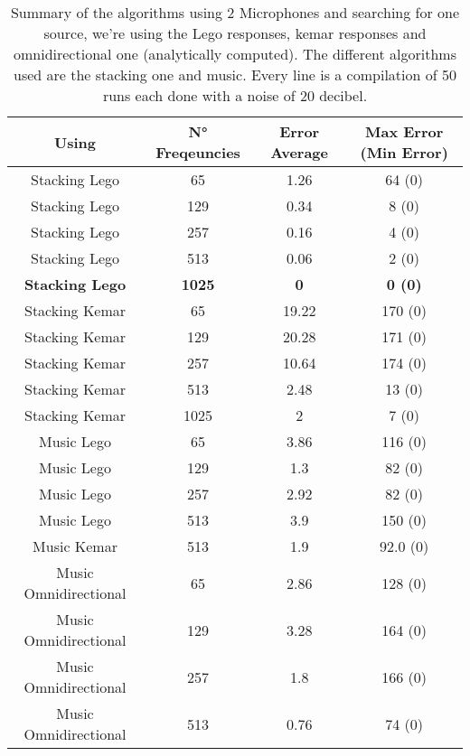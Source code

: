\begin{table}[H]
   \centering
    \begin{tabular}{|c|c|c|c|}
      \hline
      Using & N° Freqeuncies & Error Average & Max Error (Min Error) \\
      \hline
      Stacking Lego & 65 & 1.26 & 64 (0) \\
      Stacking Lego & 129 & 0.34 & 8 (0) \\
      Stacking Lego & 257 & 0.16 & 4 (0) \\
      Stacking Lego & 513 & 0.06 & 2 (0) \\
      \textbf{Stacking Lego} & \textbf{1025} & \textbf{0} & \textbf{0 (0)} \\

      Stacking Kemar & 65 & 19.22 & 170 (0) \\
      Stacking Kemar & 129 & 20.28 & 171 (0) \\
      Stacking Kemar & 257 & 10.64 & 174 (0) \\
      Stacking Kemar & 513 & 2.48 & 13 (0) \\
      Stacking Kemar & 1025 & 2 & 7 (0) \\
      
      Music Lego & 65 & 3.86 & 116 (0) \\
      Music Lego & 129 & 1.3 & 82 (0) \\
      Music Lego & 257 & 2.92 & 82 (0) \\
      Music Lego & 513 & 3.9 & 150 (0) \\
      
      
      
      Music Kemar & 513 & 1.9 & 92.0 (0) \\
      
      Music Omnidirectional & 65 & 2.86 & 128 (0) \\
      Music Omnidirectional & 129 & 3.28 & 164 (0) \\
      Music Omnidirectional & 257 & 1.8 & 166 (0) \\
      Music Omnidirectional & 513 & 0.76 & 74 (0) \\

      
      \hline
    \end{tabular}
    \caption{Summary of the algorithms using 2 Microphones and searching for one source, we're using the Lego responses, kemar responses and omnidirectional one (analytically computed). The different algorithms used are the stacking one and music. Every line is a compilation of 50 runs each done with a noise of 20 decibel.}
    \label{table:2mics2sources}
\end{table}

